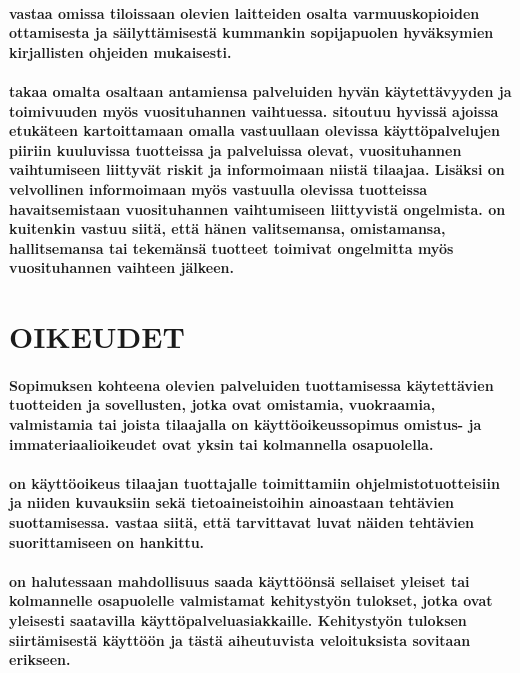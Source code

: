 \documentclass[a4paper,finnish]{article}
\begin{document}
\paragraph{ vastaa omissa tiloissaan olevien laitteiden osalta 
varmuuskopioiden ottamisesta ja säilyttämisestä kummankin sopijapuolen
hyväksymien kirjallisten ohjeiden mukaisesti.}

\paragraph{ takaa omalta osaltaan antamiensa
palveluiden hyvän käytettävyyden ja toimivuuden myös vuosituhannen
vaihtuessa.  sitoutuu hyvissä ajoissa etukäteen
kartoittamaan omalla vastuullaan olevissa käyttöpalvelujen piiriin
kuuluvissa tuotteissa ja palveluissa olevat, vuosituhannen
vaihtumiseen liittyvät riskit ja informoimaan niistä tilaajaa. Lisäksi
 on velvollinen informoimaan  myös
 vastuulla olevissa tuotteissa havaitsemistaan
vuosituhannen vaihtumiseen liittyvistä ongelmista. 
on kuitenkin vastuu siitä, että hänen valitsemansa, omistamansa,
hallitsemansa tai tekemänsä tuotteet toimivat ongelmitta myös
vuosituhannen vaihteen jälkeen.}

\section{OIKEUDET}

\paragraph{Sopimuksen kohteena olevien palveluiden tuottamisessa
käytettävien tuotteiden ja sovellusten, jotka ovat 
omistamia, vuokraamia, valmistamia tai joista tilaajalla on
käyttöoikeussopimus omistus- ja immateriaalioikeudet ovat yksin
 tai kolmannella osapuolella. }

\paragraph{ on käyttöoikeus tilaajan tuottajalle
toimittamiin ohjelmistotuotteisiin ja niiden kuvauksiin sekä
tietoaineistoihin ainoastaan  tehtävien
suottamisessa.  vastaa siitä, että tarvittavat luvat
näiden tehtävien suorittamiseen on hankittu.}

\paragraph{ on halutessaan mahdollisuus saada käyttöönsä
sellaiset  yleiset tai kolmannelle osapuolelle
valmistamat kehitystyön tulokset, jotka ovat yleisesti saatavilla
 käyttöpalveluasiakkaille. Kehitystyön tuloksen siirtämisestä
 käyttöön ja tästä aiheutuvista veloituksista sovitaan
erikseen.}
 
\end{document}
